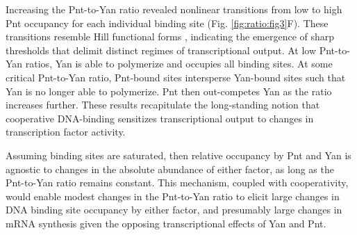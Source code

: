 Increasing the Pnt-to-Yan ratio revealed nonlinear transitions from low to high Pnt occupancy for each individual binding site (Fig. \ref{fig:ratio:fig3}F). These transitions resemble Hill functional forms \cite{Fogler1987}, indicating the emergence of sharp thresholds that delimit distinct regimes of transcriptional output. At low Pnt-to-Yan ratios, Yan is able to polymerize and occupies all binding sites. At some critical Pnt-to-Yan ratio, Pnt-bound sites intersperse Yan-bound sites such that Yan is no longer able to polymerize. Pnt then out-competes Yan as the ratio increases further. These results recapitulate the long-standing notion that cooperative DNA-binding sensitizes transcriptional output to changes in transcription factor activity.

Assuming binding sites are saturated, then relative occupancy by Pnt and Yan is agnostic to changes in the absolute abundance of either factor, as long as the Pnt-to-Yan ratio remains constant. This mechanism, coupled with cooperativity, would enable modest changes in the Pnt-to-Yan ratio to elicit large changes in DNA binding site occupancy by either factor, and presumably large changes in mRNA synthesis given the opposing transcriptional effects of Yan and Pnt.

